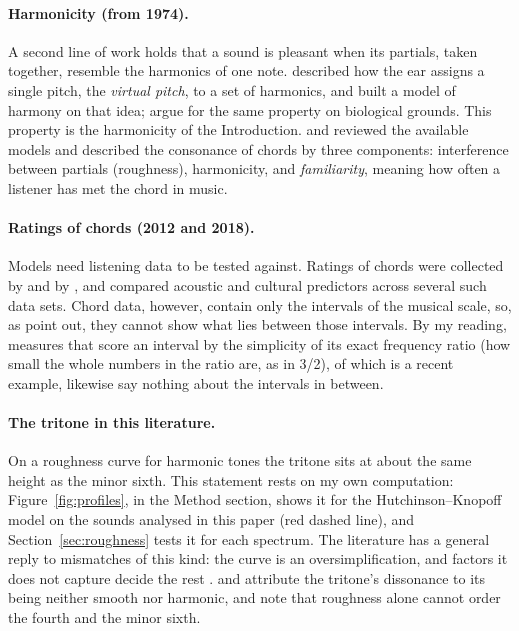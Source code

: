 \documentclass[11pt,a4paper]{article}
\begin{document}
\paragraph{Harmonicity (from 1974).}
A second line of work holds that a sound is pleasant when its partials, taken together,
resemble the harmonics of one note. \citet{terhardt1974} described how the ear assigns a
single pitch, the \emph{virtual pitch}, to a set of harmonics, and \citet{parncutt1989} built
a model of harmony on that idea; \citet{bowling2015} argue for the same property on
biological grounds. This property is the harmonicity of the Introduction. \citet{harrison2018} and
\citet{harrison2020} reviewed the available models and described the consonance of chords by
three components: interference between partials (roughness), harmonicity, and
\emph{familiarity}, meaning how often a listener has met the chord in music.

\paragraph{Ratings of chords (2012 and 2018).}
Models need listening data to be tested against. Ratings of chords were collected by
\citet{johnsonlaird2012} and by \citet{bowling2018}, and
\citet{eerola2021} compared acoustic and cultural predictors across several such data sets.
Chord data, however, contain only the intervals of the musical scale, so, as
\citet{marjieh2024} point out, they cannot show what lies between those intervals. By my reading, measures that score an interval by the
simplicity of its exact frequency ratio (how small the whole numbers in the ratio are, as in 3/2), of which \citet{deroure2026} is a recent example,
likewise say nothing about the intervals in between.

\paragraph{The tritone in this literature.}
On a roughness curve for harmonic tones the tritone sits at about the same height as the
minor sixth. This statement rests on my own computation: Figure~\ref{fig:profiles}, in the
Method section, shows it for the Hutchinson--Knopoff model on the sounds analysed in this
paper (red dashed line), and Section~\ref{sec:roughness} tests it for each spectrum. The
literature has a general reply to mismatches of this kind: the curve is an oversimplification,
and factors it does not capture decide the rest
\citep{parncutt2011,harrison2020,lahdelma2022}. \citet{parncutt1989} and \citet{parncutt2011}
attribute the tritone's dissonance to its being neither smooth nor harmonic, and
\citet{parncutt2019} note that roughness alone cannot order the fourth and the minor sixth.
\end{document}
